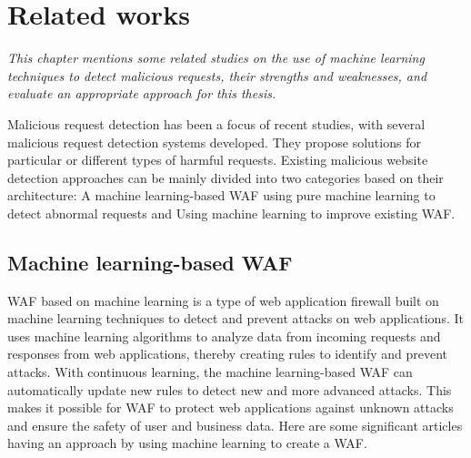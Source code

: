 \chapter{Related works}
\label{chap:literaturereview}
	\textit{\hspace{0.5cm}This chapter mentions some related studies on the use of machine learning techniques to detect malicious requests, their strengths and weaknesses, and evaluate an appropriate approach for this thesis.}
\minitoc
\newpage	

Malicious request detection has been a focus of recent studies, with several malicious request detection systems developed. They propose solutions for particular or different types of harmful requests. Existing malicious website detection approaches can be mainly divided into two categories based on their architecture: A machine learning-based WAF using pure machine learning to detect abnormal requests and Using machine learning to improve existing WAF.

\section{Machine learning-based WAF}
\label{sec:machine_learning_based}
\hspace{0.5cm}WAF based on machine learning is a type of web application firewall built on machine learning techniques to detect and prevent attacks on web applications. It uses machine learning algorithms to analyze data from incoming requests and responses from web applications, thereby creating rules to identify and prevent attacks.
With continuous learning, the machine learning-based WAF can automatically update new rules to detect new and more advanced attacks. This makes it possible for WAF to protect web applications against unknown attacks and ensure the safety of user and business data. Here are some significant articles having an approach by using machine learning to create a WAF. 

